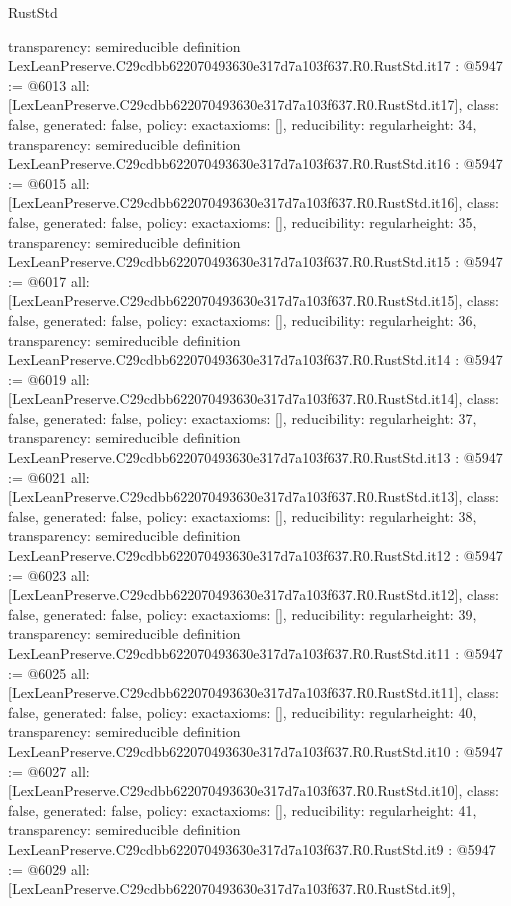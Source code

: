 \begin{lexlean}{RustStd}
\begin{coremodule}
{  transparency: semireducible
}
definition LexLeanPreserve.C29cdbb622070493630e317d7a103f637.R0.RustStd.it17 : @5947 := @6013 {
  all: [LexLeanPreserve.C29cdbb622070493630e317d7a103f637.R0.RustStd.it17],
  class: false,
  generated: false,
  policy: exact{axioms: []},
  reducibility: regular{height: 34},
  transparency: semireducible
}
definition LexLeanPreserve.C29cdbb622070493630e317d7a103f637.R0.RustStd.it16 : @5947 := @6015 {
  all: [LexLeanPreserve.C29cdbb622070493630e317d7a103f637.R0.RustStd.it16],
  class: false,
  generated: false,
  policy: exact{axioms: []},
  reducibility: regular{height: 35},
  transparency: semireducible
}
definition LexLeanPreserve.C29cdbb622070493630e317d7a103f637.R0.RustStd.it15 : @5947 := @6017 {
  all: [LexLeanPreserve.C29cdbb622070493630e317d7a103f637.R0.RustStd.it15],
  class: false,
  generated: false,
  policy: exact{axioms: []},
  reducibility: regular{height: 36},
  transparency: semireducible
}
definition LexLeanPreserve.C29cdbb622070493630e317d7a103f637.R0.RustStd.it14 : @5947 := @6019 {
  all: [LexLeanPreserve.C29cdbb622070493630e317d7a103f637.R0.RustStd.it14],
  class: false,
  generated: false,
  policy: exact{axioms: []},
  reducibility: regular{height: 37},
  transparency: semireducible
}
definition LexLeanPreserve.C29cdbb622070493630e317d7a103f637.R0.RustStd.it13 : @5947 := @6021 {
  all: [LexLeanPreserve.C29cdbb622070493630e317d7a103f637.R0.RustStd.it13],
  class: false,
  generated: false,
  policy: exact{axioms: []},
  reducibility: regular{height: 38},
  transparency: semireducible
}
definition LexLeanPreserve.C29cdbb622070493630e317d7a103f637.R0.RustStd.it12 : @5947 := @6023 {
  all: [LexLeanPreserve.C29cdbb622070493630e317d7a103f637.R0.RustStd.it12],
  class: false,
  generated: false,
  policy: exact{axioms: []},
  reducibility: regular{height: 39},
  transparency: semireducible
}
definition LexLeanPreserve.C29cdbb622070493630e317d7a103f637.R0.RustStd.it11 : @5947 := @6025 {
  all: [LexLeanPreserve.C29cdbb622070493630e317d7a103f637.R0.RustStd.it11],
  class: false,
  generated: false,
  policy: exact{axioms: []},
  reducibility: regular{height: 40},
  transparency: semireducible
}
definition LexLeanPreserve.C29cdbb622070493630e317d7a103f637.R0.RustStd.it10 : @5947 := @6027 {
  all: [LexLeanPreserve.C29cdbb622070493630e317d7a103f637.R0.RustStd.it10],
  class: false,
  generated: false,
  policy: exact{axioms: []},
  reducibility: regular{height: 41},
  transparency: semireducible
}
definition LexLeanPreserve.C29cdbb622070493630e317d7a103f637.R0.RustStd.it9 : @5947 := @6029 {
  all: [LexLeanPreserve.C29cdbb622070493630e317d7a103f637.R0.RustStd.it9],
}
\end{coremodule}
\end{lexlean}
